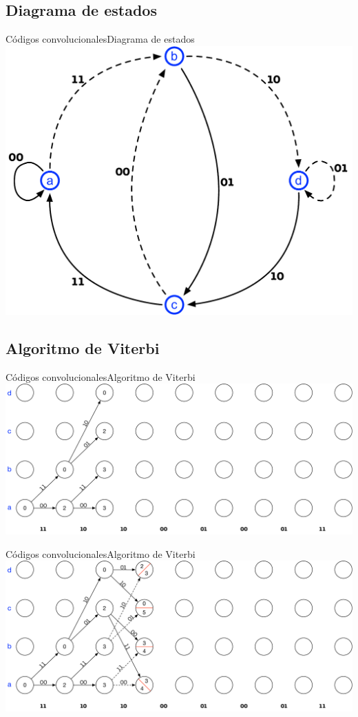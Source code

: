 \documentclass[10pt,compress]{beamer} %
\begin{document}
\subsection{Diagrama de estados}
\begin{frame}{Códigos convolucionales}{Diagrama de estados}
  \centering \includegraphics[width=0.6\linewidth]{../Apuntes/Figuras/EstadosCodigoConvolucional.pdf}
\end{frame}

\subsection{Algoritmo de Viterbi}
\begin{frame}{Códigos convolucionales}{Algoritmo de Viterbi}
  \centering \includegraphics[width=0.8\linewidth]{../Apuntes/Figuras/Viterbi_1.pdf}
\end{frame}

\begin{frame}{Códigos convolucionales}{Algoritmo de Viterbi}
  \centering \includegraphics[width=0.8\linewidth]{../Apuntes/Figuras/Viterbi_2.pdf}
\end{frame}
\end{document}
